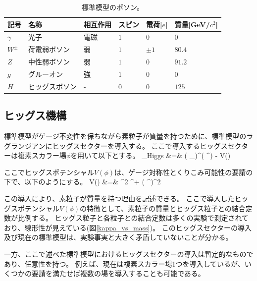 \begin{table}[tbp]
\begin{center}
\caption[標準模型のボソン]{標準模型のボソン。}
\label{SM_particle_boson}
  \small
  \begin{tabular}{|llllll|} \hline
    記号      & 名称           & 相互作用 & スピン    & 電荷[$e$] & 質量[GeV/$c^2$] \\ \hline
    $\gamma$  & 光子           & 電磁     & $1$       & $0$       & $0$             \\
    $W^{\pm}$ & 荷電弱ボソン   & 弱       & $1$       & $\pm 1$   & $80.4$          \\
    $Z$       & 中性弱ボソン   & 弱       & $1$       & $0$       & $91.2$          \\
    $g$       & グルーオン     & 強       & $1$       & $0$       & $0$             \\ \hline
    $H$       & ヒッグスボソン & -        & $0$       & $0$       & $125$           \\ \hline
  \end{tabular}
\end{center}
\end{table}

\subsection{ヒッグス機構}
標準模型がゲージ不変性を保ちながら素粒子が質量を持つために、標準模型のラグランジアンにヒッグスセクターを導入する。
ここで導入するヒッグスセクターは複素スカラー場$\phi$を用いて以下とする。
\bbb
\label{higgs_sector}
_{\rm Higgs} &=&  \left( \partial_\mu \phi \right)^\dag \left( \partial^\mu \phi \right) - V(\phi) \\
\eee

ここでヒッグスポテンシャル$V(\phi)$は、ゲージ対称性とくりこみ可能性の要請の下で、以下のようにする。
\bbb
V(\phi)  &=& \mu^2 \phi^\dag \phi + \lambda \left( \phi^\dag \phi \right)^2
\eee

この導入により、素粒子が質量を持つ理由を記述できる。
ここで導入したヒッグスポテンシャル$V(\phi)$の特徴として、素粒子の質量とヒッグス粒子との結合定数が比例する。
ヒッグス粒子と各粒子との結合定数は多くの実験で測定されており、線形性が見えている(図\ref{kappa_vs_mass})。
このヒッグスセクターの導入及び現在の標準模型は、実験事実と大きく矛盾していないことが分かる。

一方、ここで述べた標準模型におけるヒッグスセクターの導入は暫定的なものであり、任意性を持つ。
例えば、現在は複素スカラー場1つを導入しているが、いくつかの要請を満たせば複数の場を導入することも可能である。

